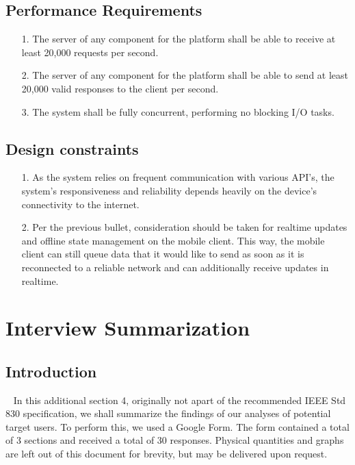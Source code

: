 \documentclass{scrreprt}
\begin{document}
\section{Performance Requirements}
\begin{enumerate}
	\item[1.] The server of any component for the platform shall be able to receive at least 20,000 requests per second.
	\item[2.] The server of any component for the platform shall be able to send at least 20,000 valid responses to the client per second.
	\item[3.] The system shall be fully concurrent, performing no blocking I/O tasks.
\end{enumerate}


\section{Design constraints}
\begin{enumerate}
	\item[1.] As the system relies on frequent communication with various API's, the system's responsiveness and reliability depends heavily on the device's connectivity to the internet.
	\item[2.] Per the previous bullet, consideration should be taken for realtime updates and offline state management on the mobile client. This way, the mobile client can still queue data that it would like to send as soon as it is reconnected to a reliable network and can additionally receive updates in realtime.
\end{enumerate}


\chapter{Interview Summarization}
\section{Introduction}
\par ~ In this additional section 4, originally not apart of the recommended IEEE Std 830 specification, we shall summarize the findings of our analyses of potential target users. To perform this, we used a Google Form. The form contained a total of 3 sections and received a total of 30 responses. Physical quantities and graphs are left out of this document for brevity, but may be delivered upon request.
\end{document}
